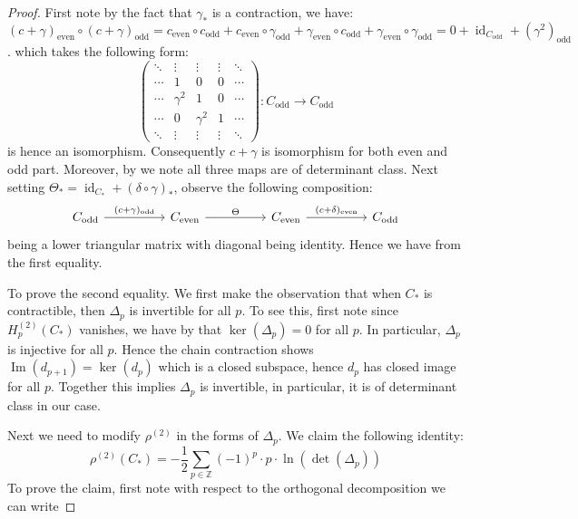 \documentclass[11pt]{report}
\theoremstyle{definition}
\theoremstyle{plain}
\DeclareMathOperator{\id}{id}
\DeclareMathOperator{\im}{Im}
\newcommand{\integer}{\mathbb{Z}}
\newcommand{\even}{\mathrm{even}}
\newcommand{\odd}{\mathrm{odd}}
\begin{document}
\begin{proof}
	First note by the fact that $\gamma_*$ is a contraction, we have:
	$(c+\gamma)_\even\circ (c+\gamma)_\odd=c_\even\circ c_\odd+c_\even\circ \gamma_\odd+\gamma_{\even}\circ c_\odd+\gamma_{\even}\circ \gamma_{\odd}=0+\id_{C_{\odd}}+(\gamma^2)_\odd$. which takes the following form:
	\begin{equation*}
	\begin{pmatrix}
	\ddots & \vdots &\vdots &\vdots &\ddots\\ \cdots &1 &0 &0 &\cdots\\ \cdots & \gamma^2 & 1 &0 &\cdots \\ \cdots &0 &\gamma^2  &1 &\cdots \\ \ddots & \vdots & \vdots & \vdots & \ddots
	\end{pmatrix}:C_\odd\to C_\odd
	\end{equation*}
is hence an isomorphism. Consequently $c+\gamma$ is isomorphism for both even and odd part. Moreover, by  we note all three maps are of determinant class. Next setting $\Theta_*=\id_{C_*}+(\delta\circ \gamma)_*$, observe the following composition:
\begin{equation*}
\begin{tikzcd}[column sep=huge]
C_\odd \rar{(c+\gamma)_\odd}&C_\even \rar{\Theta} &C_\even\rar{(c+\delta)_\even} &C_\odd
\end{tikzcd}
\end{equation*}
being a lower triangular matrix with diagonal being identity. Hence we have from  the first equality.
\par To prove the second equality. We first make the observation that when $C_*$ is contractible, then $\Delta_p$ is invertible for all $p$. To see this, first note since $H^{(2)}_p(C_*)$ vanishes, we have by  that $\ker(\Delta_p)=0$ for all $p$. In particular, $\Delta_p$ is injective  for all $p$. Hence the chain contraction shows $\im(d_{p+1})=\ker (d_p)$ which is a closed subspace, hence $d_p$ has closed image for all $p$. Together this implies $\Delta_p$ is invertible, in particular, it is of determinant class in our case.
\par Next we need to modify $\rho^{(2)}$ in the forms of $\Delta_p$. We claim the following identity:
\begin{equation}\label{3.30}
\rho^{(2)}(C_*)=-\frac{1}{2}\sum_{p\in \integer}(-1)^p\cdot p\cdot \ln(\det(\Delta_p))
\end{equation}
To prove the claim, first note with respect to the orthogonal decomposition we can write 

\end{proof}
\end{document}
